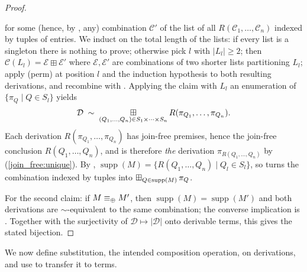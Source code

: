 \begin{proof}
\begin{itemize}
\[  \]
  for some (hence, by , any) combination $\mathcal{C}'$ of the list of all $R(\mathcal{C}_1, \ldots, \mathcal{C}_n)$ indexed by tuples of entries.
  We induct on the total length of the lists: if every list is a singleton there is nothing to prove; otherwise pick $l$ with $|L_l| \geq 2$; then $\mathcal{C}(L_l) = \mathcal{E} \boxplus \mathcal{E}'$ where $\mathcal{E}, \mathcal{E}'$ are combinations of two shorter lists partitioning $L_l$; apply (perm) at position $l$ and the induction hypothesis to both resulting derivations, and recombine with .
  Applying the claim with $L_l$ an enumeration of $\{\pi_Q \mid Q \in S_l\}$ yields
  \[
  \mathcal{D} \;\sim\; \mathop{\boxplus}\displaylimits_{(Q_1, \ldots, Q_n) \in S_1 \times \cdots \times S_n} R(\pi_{Q_1}, \ldots, \pi_{Q_n}).
  \]
  Each derivation $R(\pi_{Q_1}, \ldots, \pi_{Q_n})$ has join-free premises, hence the join-free conclusion $R(Q_1, \ldots, Q_n)$, and is therefore \emph{the} derivation $\pi_{R(Q_1, \ldots, Q_n)}$ by (\ref{join_free:unique}).
  By , $\operatorname{supp}(M) = \{ R(Q_1, \ldots, Q_n) \mid Q_l \in S_l \}$, so  turns the combination indexed by tuples into $\mathop{\boxplus}\displaylimits_{Q \in \operatorname{supp}(M)} \pi_Q$.
\end{itemize}
For the second claim: if $M \equiv_{\mathbin{\oplus}} M'$, then $\operatorname{supp}(M) = \operatorname{supp}(M')$ and both derivations are $\sim$-equivalent to the same combination; the converse implication is .
Together with the surjectivity of $\mathcal{D} \mapsto |\mathcal{D}|$ onto derivable terms, this gives the stated bijection.
\end{proof}

We now define substitution, the intended composition operation, on derivations, and use  to transfer it to terms.

